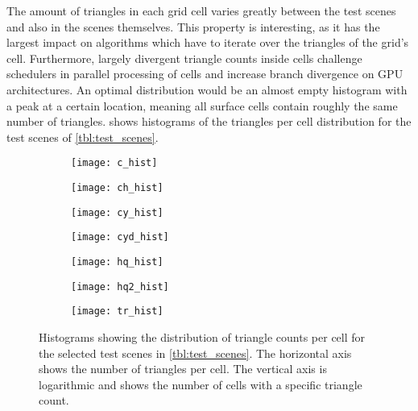The amount of triangles in each grid cell varies greatly between the test scenes and also in the scenes themselves.
This property is interesting, as it has the largest impact on algorithms which have to iterate over the triangles of the grid's cell.
Furthermore, largely divergent triangle counts inside cells challenge schedulers in parallel processing of cells and increase branch divergence on GPU architectures.
An optimal distribution would be an almost empty histogram with a peak at a certain location, meaning all surface cells contain roughly the same number of triangles.
 shows histograms of the triangles per cell distribution for the test scenes of \cref{tbl:test_scenes}.
%
\begin{figure}[!]
	\centering
	\begin{subfigure}[b]{0.49\textwidth}
		\centering
		\texttt{[image: c\_hist]}
		\caption{\cubes}
		\label{fig:cube2_histogram}
	\end{subfigure}
	\begin{subfigure}[b]{0.49\textwidth}
		\centering
		\texttt{[image: ch\_hist]}
		\caption{\cylinderhead}
		\label{fig:cylinder_head_histogram}
	\end{subfigure}
	\begin{subfigure}[b]{0.49\textwidth}
		\centering
		\texttt{[image: cy\_hist]}
		\caption{\cylinders}
		\label{fig:cylinders_histogram}
	\end{subfigure}
	\begin{subfigure}[b]{0.49\textwidth}
		\centering
		\texttt{[image: cyd\_hist]}
		\caption{\cylindersd}
		\label{fig:cylinders_d_histogram}
	\end{subfigure}
	\begin{subfigure}[b]{0.49\textwidth}
		\centering
		\texttt{[image: hq\_hist]}
		\caption{\impeller}
		\label{fig:impeller_histogram}
	\end{subfigure}
	\begin{subfigure}[b]{0.49\textwidth}
		\centering
		\texttt{[image: hq2\_hist]}
		\caption{\impellerhalf}
		\label{fig:impeller_2_histogram}
	\end{subfigure}
	\begin{subfigure}[b]{0.49\textwidth}
		\centering
		\texttt{[image: tr\_hist]}
		\caption{\turbine}
		\label{fig:turbine_histogram}
	\end{subfigure}
	\caption[Test scene histograms]{
		Histograms showing the distribution of triangle counts per cell for the selected test scenes in \cref{tbl:test_scenes}.
		The horizontal axis shows the number of triangles per cell.
		The vertical axis is logarithmic and shows the number of cells with a specific triangle count.
	}
	\label{fig:histograms}
\end{figure}

